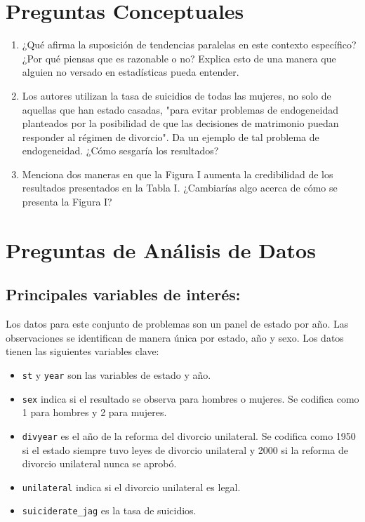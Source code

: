 \documentclass[11pt,a4paper,english]{article}
\begin{document}
\section*{Preguntas Conceptuales}

\begin{enumerate}
    \item ¿Qué afirma la suposición de tendencias paralelas en este contexto específico? ¿Por qué piensas que es razonable o no? Explica esto de una manera que alguien no versado en estadísticas pueda entender.
    
    \item Los autores utilizan la tasa de suicidios de todas las mujeres, no solo de aquellas que han estado casadas, "para evitar problemas de endogeneidad planteados por la posibilidad de que las decisiones de matrimonio puedan responder al régimen de divorcio". Da un ejemplo de tal problema de endogeneidad. ¿Cómo sesgaría los resultados?
    
    \item Menciona dos maneras en que la Figura I aumenta la credibilidad de los resultados presentados en la Tabla I. ¿Cambiarías algo acerca de cómo se presenta la Figura I?
\end{enumerate}

\section*{Preguntas de Análisis de Datos}

\subsection*{Principales variables de interés:}
Los datos para este conjunto de problemas son un panel de estado por año. Las observaciones se identifican de manera única por estado, año y sexo. Los datos tienen las siguientes variables clave:
\begin{itemize}
    \item \texttt{st} y \texttt{year} son las variables de estado y año.
    \item \texttt{sex} indica si el resultado se observa para hombres o mujeres. Se codifica como 1 para hombres y 2 para mujeres.
    \item \texttt{divyear} es el año de la reforma del divorcio unilateral. Se codifica como 1950 si el estado siempre tuvo leyes de divorcio unilateral y 2000 si la reforma de divorcio unilateral nunca se aprobó.
    \item \texttt{unilateral} indica si el divorcio unilateral es legal.
    \item \texttt{suiciderate\_jag} es la tasa de suicidios.
\end{itemize}
\end{document}
